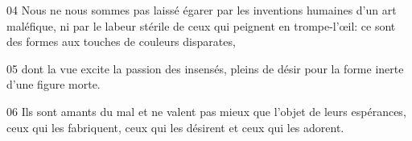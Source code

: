
04 Nous ne nous sommes pas laissé égarer par les inventions humaines d’un art maléfique, ni par le labeur stérile de ceux qui peignent en trompe-l’œil: ce sont des formes aux touches de couleurs disparates,

05 dont la vue excite la passion des insensés, pleins de désir pour la forme inerte d’une figure morte.

06 Ils sont amants du mal et ne valent pas mieux que l’objet de leurs espérances, ceux qui les fabriquent, ceux qui les désirent et ceux qui les adorent.
